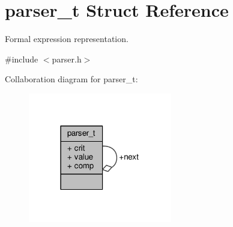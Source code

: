 \hypertarget{structparser__t}{}\section{parser\+\_\+t Struct Reference}
\label{structparser__t}


Formal expression representation.  




{\ttfamily \#include $<$parser.\+h$>$}



Collaboration diagram for parser\+\_\+t\+:\nopagebreak
\begin{figure}[H]
\begin{center}
\leavevmode
\includegraphics[width=178pt]{structparser__t__coll__graph}
\end{center}
\end{figure}

